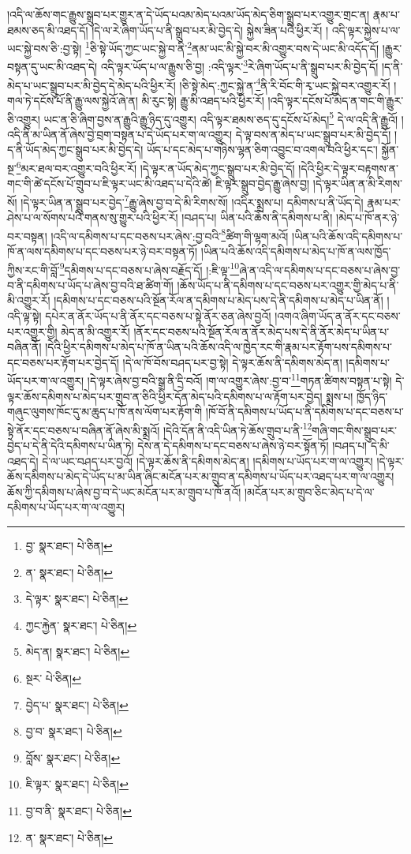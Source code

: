 །འདི་ལ་ཆོས་གང་རྒྱུས་སྒྲུབ་པར་གྱུར་ན་དེ་ཡོད་པའམ་མེད་པའམ་ཡོད་མེད་ཅིག་སྒྲུབ་པར་འགྱུར་གྲང་ན། རྣམ་པ་ཐམས་ཅད་མི་འཐད་དོ། །དེ་ལ་རེ་ཞིག་ཡོད་པ་ནི་སྒྲུབ་པར་མི་བྱེད་དེ། སྐྱེས་ཟིན་པའི་ཕྱིར་རོ། །
འདི་ལྟར་སྐྱེས་པ་ལ་ཡང་སྐྱེ་བས་ཅི་:བྱ་སྟེ། \footnote{བྱ་  སྣར་ཐང་།  པེ་ཅིན། }ཅི་སྟེ་ཡོད་ཀྱང་ཡང་སྐྱེ་བ་ནི་\footnote{ན་  སྣར་ཐང་།  པེ་ཅིན། }ནམ་ཡང་མི་སྐྱེ་བར་མི་འགྱུར་བས་དེ་ཡང་མི་འདོད་དོ། །རྒྱུར་བསྟན་དུ་ཡང་མི་འཐད་དེ། འདི་ལྟར་ཡོད་པ་ལ་རྒྱུས་ཅི་བྱ། :འདི་ལྟར་\footnote{དེ་ལྟར་  སྣར་ཐང་།  པེ་ཅིན། }རེ་ཞིག་ཡོད་པ་ནི་སྒྲུབ་པར་མི་བྱེད་དོ། །ད་ནི་མེད་པ་ཡང་སྒྲུབ་པར་མི་བྱེད་དེ་མེད་པའི་ཕྱིར་རོ། །ཅི་སྟེ་མེད་:ཀྱང་སྐྱེ་ན་\footnote{ཀྱང་རྐྱེན་  སྣར་ཐང་།  པེ་ཅིན། }ནི་རི་བོང་གི་རྭ་ཡང་སྐྱེ་བར་འགྱུར་རོ། །གལ་ཏེ་དངོས་པོ་ནི་རྒྱུ་ལས་སྐྱེའོ་ཞེ་ན། མི་རུང་སྟེ། རྒྱུ་མི་འཐད་པའི་ཕྱིར་རོ། །འདི་ལྟར་དངོས་པོ་མེད་ན་གང་གི་རྒྱུར་ཅི་འགྱུར། ཡང་ན་ཅི་ཞིག་བྱས་ན་རྒྱུའི་རྒྱུ་ཉིད་དུ་འགྱུར། འདི་ལྟར་ཐམས་ཅད་དུ་དངོས་པོ་མེད།\footnote{མེད་ན།  སྣར་ཐང་།  པེ་ཅིན། } དེ་ལ་འདི་ནི་རྒྱུའོ། །འདི་ནི་མ་ཡིན་ནོ་ཞེས་བྱེ་བྲག་བསྟན་པ་དེ་ཡོད་པར་ག་ལ་འགྱུར། དེ་ལྟ་བས་ན་མེད་པ་ཡང་སྒྲུབ་པར་མི་བྱེད་དོ། །ད་ནི་ཡོད་མེད་ཀྱང་སྒྲུབ་པར་མི་བྱེད་དེ། ཡོད་པ་དང་མེད་པ་གཉིས་ལྷན་ཅིག་འབྱུང་བ་འགལ་བའི་ཕྱིར་དང་། སྐྱོན་སྔ་\footnote{སྔར་  པེ་ཅིན། }མར་ཐལ་བར་འགྱུར་བའི་ཕྱིར་རོ། །དེ་ལྟར་ན་ཡོད་མེད་ཀྱང་སྒྲུབ་པར་མི་བྱེད་དོ། །དེའི་ཕྱིར་དེ་ལྟར་བརྟགས་ན་གང་གི་ཚེ་དངོས་པོ་གྲུབ་པ་ཇི་ལྟར་ཡང་མི་འཐད་པ་དེའི་ཚེ། ཇི་ལྟར་སྒྲུབ་བྱེད་རྒྱུ་ཞེས་བྱ། །དེ་ལྟར་ཡིན་ན་མི་རིགས་སོ། །དེ་ལྟར་ཡིན་ན་སྒྲུབ་པར་བྱེད་\footnote{བྱེད་པ་  སྣར་ཐང་།  པེ་ཅིན། }རྒྱུ་ཞེས་བྱ་བ་དེ་མི་རིགས་སོ། །འདིར་སྨྲས་པ། དམིགས་པ་ནི་ཡོད་དེ། རྣམ་པར་ཤེས་པ་ལ་སོགས་པའི་གནས་སུ་གྱུར་པའི་ཕྱིར་རོ། །བཤད་པ། ཡིན་པའི་ཆོས་ནི་དམིགས་པ་ནི། །མེད་པ་ཁོ་ནར་ཉེ་བར་བསྟན། །འདི་ལ་དམིགས་པ་དང་བཅས་པར་ཞེས་:བྱ་བའི་\footnote{བྱ་བ་  སྣར་ཐང་།  པེ་ཅིན། }ཚིག་གི་ལྷག་མའོ། །ཡིན་པའི་ཆོས་འདི་དམིགས་པ་ཁོ་ན་ལས་དམིགས་པ་དང་བཅས་པར་ཉེ་བར་བསྟན་ཏོ། །ཡིན་པའི་ཆོས་འདི་དམིགས་པ་མེད་པ་ཁོ་ན་ལས་ཁྱོད་ཀྱིས་རང་གི་བློ་\footnote{བློས་  སྣར་ཐང་།  པེ་ཅིན། }དམིགས་པ་དང་བཅས་པ་ཞེས་བརྗོད་དོ། །:ཇི་ལྟ་\footnote{ཇི་ལྟར་  སྣར་ཐང་།  པེ་ཅིན། }ཞེ་ན་འདི་ལ་དམིགས་པ་དང་བཅས་པ་ཞེས་བྱ་བ་ནི་དམིགས་པ་ཡོད་པ་ཞེས་བྱ་བའི་ཐ་ཚིག་གོ། །ཆོས་ཡོད་པ་ནི་དམིགས་པ་དང་བཅས་པར་འགྱུར་གྱི་མེད་པ་ནི་མི་འགྱུར་རོ། །དམིགས་པ་དང་བཅས་པའི་སྔོན་རོལ་ན་དམིགས་པ་མེད་པས་དེ་ནི་དམིགས་པ་མེད་པ་ཡིན་ནོ། །འདི་ལྟ་སྟེ། དཔེར་ན་ནོར་ཡོད་པ་ནི་ནོར་དང་བཅས་པ་སྟེ་ནོར་ཅན་ཞེས་བྱའོ། །འགའ་ཞིག་ཡོད་ན་ནོར་དང་བཅས་པར་འགྱུར་གྱི། མེད་ན་མི་འགྱུར་རོ། །ནོར་དང་བཅས་པའི་སྔོན་རོལ་ན་ནོར་མེད་པས་དེ་ནི་ནོར་མེད་པ་ཡིན་པ་བཞིན་ནོ། །དེའི་ཕྱིར་དམིགས་པ་མེད་པ་ཁོ་ན་ཡིན་པའི་ཆོས་འདི་ལ་ཁྱེད་རང་གི་རྣམ་པར་རྟོག་པས་དམིགས་པ་དང་བཅས་པར་རྟོག་པར་བྱེད་དོ། །དེ་ལ་ཁོ་བོས་བཤད་པར་བྱ་སྟེ། དེ་ལྟར་ཆོས་ནི་དམིགས་མེད་ན། །དམིགས་པ་ཡོད་པར་ག་ལ་འགྱུར། །དེ་ལྟར་ཞེས་བྱ་བའི་སྒྲ་ནི་དྲི་བའོ། །ག་ལ་འགྱུར་ཞེས་:བྱ་བ་\footnote{བྱ་བ་ནི་  སྣར་ཐང་།  པེ་ཅིན། }གཏན་ཚིགས་བསྟན་པ་སྟེ། དེ་ལྟར་ཆོས་དམིགས་པ་མེད་པར་གྲུབ་ན་ཅིའི་ཕྱིར་དོན་མེད་པའི་དམིགས་པ་ལ་རྟོག་པར་བྱེད། སྨྲས་པ། ཁྱོད་ཉིད་གཞུང་ལུགས་ཁོང་དུ་མ་ཆུད་པ་ཁོ་ནས་ལོག་པར་རྟོག་གི །ཁོ་བོ་ནི་དམིགས་པ་ཡོད་པ་ནི་དམིགས་པ་དང་བཅས་པ་སྟེ་ནོར་དང་བཅས་པ་བཞིན་ནོ་ཞེས་མི་སྨྲའོ། །དེའི་དོན་ནི་འདི་ཡིན་ཏེ་ཆོས་གྲུབ་པ་ནི་\footnote{ན་  སྣར་ཐང་།  པེ་ཅིན། }གཞི་གང་གིས་སྒྲུབ་པར་བྱེད་པ་དེ་ནི་དེའི་དམིགས་པ་ཡིན་ཏེ། དེས་ན་དེ་དམིགས་པ་དང་བཅས་པ་ཞེས་ཉེ་བར་སྟོན་ཏོ། །བཤད་པ། དེ་མི་འཐད་དེ། དེ་ལ་ཡང་བཤད་པར་བྱའོ། །དེ་ལྟར་ཆོས་ནི་དམིགས་མེད་ན། །དམིགས་པ་ཡོད་པར་ག་ལ་འགྱུར། །དེ་ལྟར་ཆོས་དམིགས་པ་མེད་དེ་ཡོད་པ་མ་ཡིན་ཞིང་མངོན་པར་མ་གྲུབ་ན་དམིགས་པ་ཡོད་པར་འཐད་པར་ག་ལ་འགྱུར། ཆོས་ཀྱི་དམིགས་པ་ཞེས་བྱ་བ་དེ་ཡང་མངོན་པར་མ་གྲུབ་པ་ཁོ་ནའོ། །མངོན་པར་མ་གྲུབ་ཅིང་མེད་པ་དེ་ལ་དམིགས་པ་ཡོད་པར་ག་ལ་འགྱུར། 